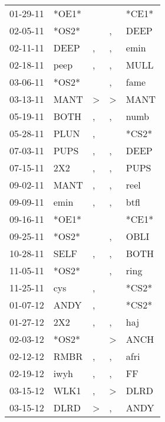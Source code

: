 \begin{supertabular}{lllll}
 01-29-11 &  *OE1* &                  &                  &  *CE1* \\
 02-05-11 &  *OS2* &                  &                , &   DEEP \\
 02-11-11 &   DEEP &                , &                , &   emin \\
 02-18-11 &   peep &                , &                , &   MULL \\
 03-06-11 &  *OS2* &                  &                , &   fame \\
 03-13-11 &   MANT &     \textgreater &     \textgreater &   MANT \\
 05-19-11 &   BOTH &                , &                , &   numb \\
 05-28-11 &   PLUN &                , &                  &  *CS2* \\
 07-03-11 &   PUPS &                , &                , &   DEEP \\
 07-15-11 &    2X2 &                , &                , &   PUPS \\
 09-02-11 &   MANT &                , &                , &   reel \\
 09-09-11 &   emin &                , &                , &   btfl \\
 09-16-11 &  *OE1* &                  &                  &  *CE1* \\
 09-25-11 &  *OS2* &                  &                , &   OBLI \\
 10-28-11 &   SELF &                , &                , &   BOTH \\
 11-05-11 &  *OS2* &                  &                , &   ring \\
 11-25-11 &    cys &                , &                  &  *CS2* \\
 01-07-12 &   ANDY &                , &                  &  *CS2* \\
 01-27-12 &    2X2 &                , &                , &    haj \\
 02-03-12 &  *OS2* &                  &     \textgreater &   ANCH \\
 02-12-12 &   RMBR &                , &                , &   afri \\
 02-19-12 &   iwyh &                , &                , &     FF \\
 03-15-12 &   WLK1 &                , &     \textgreater &   DLRD \\
 03-15-12 &   DLRD &     \textgreater &                , &   ANDY \\

\end{supertabular}
